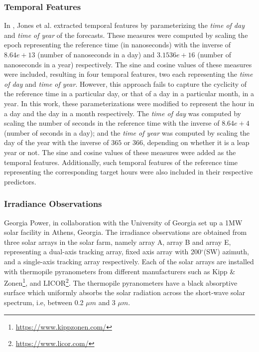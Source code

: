\subsubsection*{Temporal Features}
\par In \cite{thesis_zach}, Jones et al. extracted temporal features by parameterizing the \textit{time of day} and \textit{time of year} of the forecasts. These measures were computed by scaling the epoch representing the reference time (in nanoseconds) with the inverse of $8.64e+13$ (number of nanoseconds in a day) and $3.1536e+16$ (number of nanoseconds in a year) respectively. The sine and cosine values of these measures were included, resulting in four temporal features, two each representing the \textit{time of day} and \textit{time of year}. However, this approach fails to capture the cyclicity of the reference time in a particular day, or that of a day in a particular month, in a year. In this work, these parameterizations  were modified to represent the hour in a day and the day in a month respectively. The \textit{time of day} was computed by scaling the number of seconds in the reference time with the inverse of $8.64e+4$ (number of seconds in a day); and the \textit{time of year} was computed by scaling the day of the year with the inverse of $365$ or $366$, depending on whether it is a leap year or not. The sine and cosine values of these measures were added as the temporal features. Additionally, such temporal features of the reference time representing the corresponding target hours were also included in their respective predictors.

\subsubsection*{Irradiance Observations}
\par Georgia Power, in collaboration with the University of Georgia set up a 1MW solar facility in Athens, Georgia. The irradiance observations are obtained from three solar arrays in the solar farm, namely array A, array B and array E, representing a dual-axis tracking array, fixed axis array with 200$^{\circ}$(SW) azimuth, and a single-axis tracking array respectively. Each of the solar arrays are installed with thermopile pyranometers from different manufacturers such as Kipp \& Zonen\footnote{\url{https://www.kippzonen.com/}}, and LICOR\footnote{\url{https://www.licor.com/}}. The thermopile pyranometers have a black absorptive surface which uniformly absorbs the solar radiation across the short-wave solar spectrum, i.e, between 0.2 $\mu m$ and 3 $\mu m$. 

